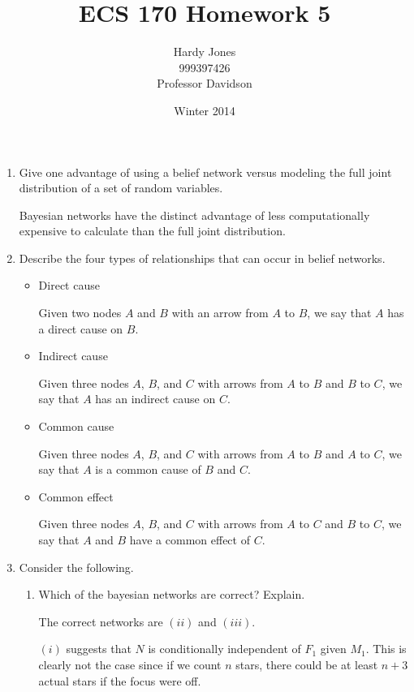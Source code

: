 \documentclass[12pt,letterpaper]{article}
\title{ECS 170 Homework 5\vspace{-2ex}}
\author{Hardy Jones\\
        999397426\\
        Professor Davidson\vspace{-2ex}}
\date{Winter 2014}
\begin{document}
  \maketitle

  \begin{enumerate}
    \item Give one advantage of using a belief network versus modeling the full joint distribution of a set of random variables.

    Bayesian networks have the distinct advantage of less computationally expensive to calculate than the full joint distribution.

    \item Describe the four types of relationships that can occur in belief networks.
      \begin{itemize}
        \item Direct cause

          Given two nodes $A$ and $B$ with an arrow from $A$ to $B$,
          we say that $A$ has a direct cause on $B$.
        \item Indirect cause

          Given three nodes $A$, $B$, and $C$
          with arrows from $A$ to $B$ and $B$ to $C$,
          we say that $A$ has an indirect cause on $C$.
        \item Common cause

          Given three nodes $A$, $B$, and $C$
          with arrows from $A$ to $B$ and $A$ to $C$,
          we say that $A$ is a common cause of $B$ and $C$.
        \item Common effect

          Given three nodes $A$, $B$, and $C$
          with arrows from $A$ to $C$ and $B$ to $C$,
          we say that $A$ and $B$ have a common effect of $C$.
      \end{itemize}

    \item Consider the following.
      \begin{enumerate}
        \item Which of the bayesian networks are correct? Explain.

        The correct networks are $(ii)$ and $(iii)$.

        $(i)$ suggests that $N$ is conditionally independent of $F_1$ given $M_1$.
        This is clearly not the case since if we count $n$ stars,
        there could be at least $n + 3$ actual stars if the focus were off.


\end{enumerate}
\end{enumerate}
\end{document}

